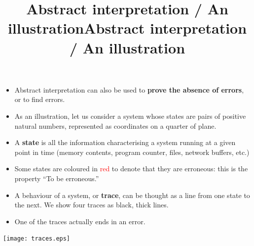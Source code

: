 \documentclass[wide]{slides}
\begin{document}
\begin{slide}
  \title{Abstract interpretation / An illustration}

  \begin{itemize}

    \item Abstract interpretation can also be used to \textbf{prove
      the absence of errors}, or to find errors.

    \item As an illustration, let us consider a system whose states
      are pairs of positive natural numbers, represented as
      coordinates on a quarter of plane.

    \item A \textbf{state} is all the information characterising a
      system running at a given point in time (memory contents,
      program counter, files, network buffers, etc.)

    \item Some states are coloured in \textcolor{red}{red} to denote
      that they are erroneous: this is the property ``To be
      erroneous.''

    \item A behaviour of a system, or \textbf{trace}, can be thought
      as a line from one state to the next. We show four traces as
      black, thick lines.

    \item One of the traces actually ends in an error.

  \end{itemize}

\end{slide}

\begin{slide}
  \title{Abstract interpretation / An illustration}

  \begin{center}
    \texttt{[image: traces.eps]}
  \end{center}

\end{slide}
\end{document}
